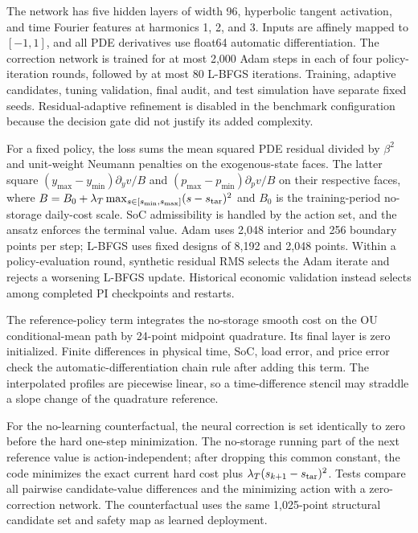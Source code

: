 \documentclass[preprint,11pt]{elsarticle}
\begin{document}
The network has five hidden layers of width 96, hyperbolic tangent activation,
and time Fourier features at harmonics 1, 2, and 3. Inputs are affinely mapped
to $[-1,1]$, and all PDE derivatives use float64 automatic differentiation.
The correction network is trained for at most 2,000 Adam steps in each of four
policy-iteration rounds, followed by at most 80 L-BFGS iterations. Training,
adaptive candidates, tuning validation, final audit, and test simulation have
separate fixed seeds. Residual-adaptive refinement is disabled in the
benchmark configuration because the decision gate did not justify its added
complexity.

For a fixed policy, the loss sums the mean squared PDE residual divided by
$\beta^2$ and unit-weight Neumann penalties on the exogenous-state faces.
The latter square $(y_{\max}-y_{\min})\partial_y v/B$ and
$(p_{\max}-p_{\min})\partial_p v/B$ on their respective faces, where
$B=B_0+\lambda_T\max_{s\in[s_{\min},s_{\max}]}(s-s_{\rm tar})^2$ and $B_0$
is the training-period no-storage daily-cost scale. SoC admissibility is
handled by the action set, and the ansatz enforces the terminal value.
Adam uses 2,048 interior and 256 boundary points per step; L-BFGS uses fixed
designs of 8,192 and 2,048 points. Within a policy-evaluation round, synthetic
residual RMS selects the Adam iterate and rejects a worsening L-BFGS update.
Historical economic validation instead selects among completed PI checkpoints
and restarts.

The reference-policy term integrates the no-storage smooth cost on the OU
conditional-mean path by 24-point midpoint quadrature. Its final layer is zero
initialized. Finite differences in physical time, SoC, load error, and price
error check the automatic-differentiation chain rule after adding this term.
The interpolated profiles are piecewise linear, so a time-difference stencil
may straddle a slope change of the quadrature reference.

For the no-learning counterfactual, the neural correction is set identically
to zero before the hard one-step minimization. The no-storage running part of
the next reference value is action-independent; after dropping this common
constant, the code minimizes the exact current hard cost plus
$\lambda_T(s_{k+1}-s_{\rm tar})^2$. Tests compare all pairwise candidate-value
differences and the minimizing action with a zero-correction network. The
counterfactual uses the same 1,025-point structural candidate set and safety
map as learned deployment.
\end{document}
